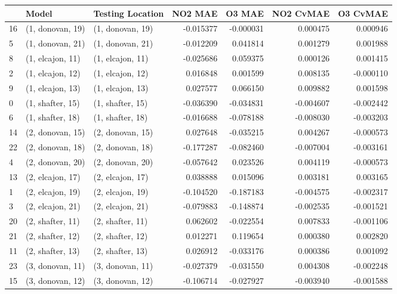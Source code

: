 \begin{tabular}{lllrrrr}
\toprule
{} &             Model &  Testing Location &   NO2 MAE &    O3 MAE &  NO2 CvMAE &  O3 CvMAE \\
\midrule
16 &  (1, donovan, 19) &  (1, donovan, 19) & -0.015377 & -0.000031 &   0.000475 &  0.000946 \\
5  &  (1, donovan, 21) &  (1, donovan, 21) & -0.012209 &  0.041814 &   0.001279 &  0.001988 \\
8  &  (1, elcajon, 11) &  (1, elcajon, 11) & -0.025686 &  0.059375 &   0.000126 &  0.001415 \\
2  &  (1, elcajon, 12) &  (1, elcajon, 12) &  0.016848 &  0.001599 &   0.008135 & -0.000110 \\
9  &  (1, elcajon, 13) &  (1, elcajon, 13) &  0.027577 &  0.066150 &   0.009882 &  0.001598 \\
0  &  (1, shafter, 15) &  (1, shafter, 15) & -0.036390 & -0.034831 &  -0.004607 & -0.002442 \\
6  &  (1, shafter, 18) &  (1, shafter, 18) & -0.016688 & -0.078188 &  -0.008030 & -0.003203 \\
14 &  (2, donovan, 15) &  (2, donovan, 15) &  0.027648 & -0.035215 &   0.004267 & -0.000573 \\
22 &  (2, donovan, 18) &  (2, donovan, 18) & -0.177287 & -0.082460 &  -0.007004 & -0.003161 \\
4  &  (2, donovan, 20) &  (2, donovan, 20) & -0.057642 &  0.023526 &   0.004119 & -0.000573 \\
13 &  (2, elcajon, 17) &  (2, elcajon, 17) &  0.038888 &  0.015096 &   0.003181 &  0.003165 \\
1  &  (2, elcajon, 19) &  (2, elcajon, 19) & -0.104520 & -0.187183 &  -0.004575 & -0.002317 \\
3  &  (2, elcajon, 21) &  (2, elcajon, 21) & -0.079883 & -0.148874 &  -0.002535 & -0.001521 \\
20 &  (2, shafter, 11) &  (2, shafter, 11) &  0.062602 & -0.022554 &   0.007833 & -0.001106 \\
21 &  (2, shafter, 12) &  (2, shafter, 12) &  0.012271 &  0.119654 &   0.000380 &  0.002820 \\
11 &  (2, shafter, 13) &  (2, shafter, 13) &  0.026912 & -0.033176 &   0.000386 &  0.001092 \\
23 &  (3, donovan, 11) &  (3, donovan, 11) & -0.027379 & -0.031550 &   0.004308 & -0.002248 \\
15 &  (3, donovan, 12) &  (3, donovan, 12) & -0.106714 & -0.027927 &  -0.003940 & -0.001588 \\

\end{tabular}
